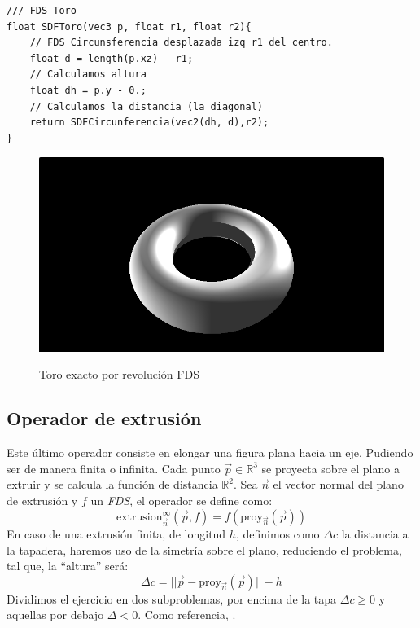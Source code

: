\begin{lstlisting}
/// FDS Toro
float SDFToro(vec3 p, float r1, float r2){
    // FDS Circunsferencia desplazada izq r1 del centro.
    float d = length(p.xz) - r1;
    // Calculamos altura
    float dh = p.y - 0.;
    // Calculamos la distancia (la diagonal)
    return SDFCircunferencia(vec2(dh, d),r2);
}
\end{lstlisting}

\begin{figure}[H]
  \centering
  \captionsetup{justification=centering}%
  \includegraphics[width=1.0\textwidth]{secciones/imagenes/sdf/3d/sdf_toro.png}\label{fig:torus}
  \caption{Toro exacto por revolución FDS}
\end{figure}

\subsection{Operador de extrusión}
Este último operador consiste en elongar una figura plana hacia un eje. Pudiendo ser de manera finita o infinita. Cada punto \(\Vec{p}\in\mathbb{R}^3\) se proyecta sobre el plano a extruir y se calcula la función de distancia \(\mathbb{R}^2\). Sea \(\Vec{n}\) el  vector normal del plano de extrusión y \(f\) un \textit{FDS}, el operador se define como:
\[\text{extrusion}^\infty_{\Vec{n}}\left(\Vec{p},f\right) = f\left(\text{proy}_{\Vec{n}}(\Vec{p})\right)\]
En caso de una extrusión finita, de longitud \(h\), definimos como \(\Delta c\) la distancia a la tapadera, haremos uso de la simetría sobre el plano, reduciendo el problema, tal que, la \enquote{altura} será:
\[\Delta c  =\vert\vert \Vec{p} - \text{proy}_{\Vec{n}}(\Vec{p}) \vert\vert - h\]
Dividimos el ejercicio en dos subproblemas, por encima de la tapa \(\Delta c \ge 0\) y aquellas por debajo \(\Delta < 0\). Como referencia, .

